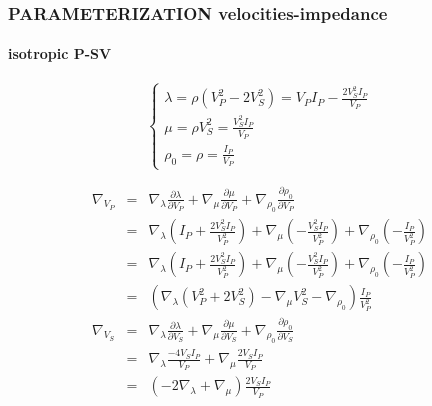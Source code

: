 \documentclass[9pt]{beamer}
\newcommand{\partderi}[2]{\frac{\partial#1}{\partial#2}}
\begin{document}
\begin{frame}
\end{frame}

\begin{frame}\frametitle{PARAMETERIZATION velocities-impedance}
\framesubtitle{isotropic P-SV}

  
  \begin{minipage}{\linewidth}
    \[\left\{ \begin{array}{l}
      \lambda = \rho (V_P^2-2V_S^2) = V_PI_P - \frac{2V_S^2I_P}{V_P} \\
      \mu    = \rho V_S^2 = \frac{V_S^2I_P}{V_P} \\
      \rho_0 = \rho = \frac{I_P}{V_P}
    \end{array} \right.\]
    
    \begin{eqnarray}
      \nabla_{V_P} &=& \nabla_\lambda \partderi{\lambda}{V_P} + \nabla_\mu \partderi{\mu}{V_P} + \nabla_{\rho_0} \partderi{\rho_0}{V_P} \nonumber\\
                   &=& \nabla_\lambda \left(I_P+\frac{2V_S^2I_P}{V_P^2}\right) + \nabla_\mu \left(-\frac{V_S^2I_P}{V_P^2}\right) + \nabla_{\rho_0} \left(-\frac{I_P}{V_P^2}\right) \nonumber\\
                   &=& \nabla_\lambda \left(I_P+\frac{2V_S^2I_P}{V_P^2}\right) + \nabla_\mu \left(-\frac{V_S^2I_P}{V_P^2}\right) + \nabla_{\rho_0} \left(-\frac{I_P}{V_P^2}\right) \nonumber\\
                   &=& \left( \nabla_\lambda (V_P^2+2V_S^2) - \nabla_\mu V_S^2 - \nabla_{\rho_0} \right) \frac{I_P}{V_P^2} \nonumber\\
      \nabla_{V_S} &=& \nabla_\lambda \partderi{\lambda}{V_S} + \nabla_\mu \partderi{\mu}{V_S} + \nabla_{\rho_0} \partderi{\rho_0}{V_S} \nonumber\\
                   &=& \nabla_\lambda \frac{-4V_SI_P}{V_P} + \nabla_\mu \frac{2V_SI_P}{V_P} \nonumber\\
                   &=& \left( -2\nabla_\lambda + \nabla_\mu \right) \frac{2V_SI_P}{V_P} \nonumber
    \end{eqnarray}


\end{minipage}
\end{frame}
\end{document}
